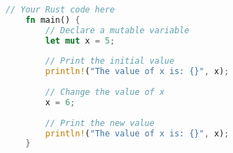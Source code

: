 \newpage


\begin{lstlisting}[language=Rust, style=test]
	// Your Rust code here
	fn main() {
		// Declare a mutable variable
		let mut x = 5; 
		
		// Print the initial value
		println!("The value of x is: {}", x); 
		
		// Change the value of x
		x = 6; 
		
		// Print the new value
		println!("The value of x is: {}", x); 
	}
\end{lstlisting}